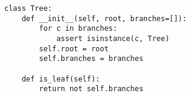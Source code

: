 \begin{lstlisting}
class Tree:
    def __init__(self, root, branches=[]):
        for c in branches:
            assert isinstance(c, Tree)
        self.root = root
        self.branches = branches

    def is_leaf(self):
        return not self.branches
\end{lstlisting}
